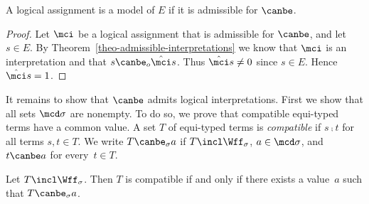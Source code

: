 \begin{lem}
  \label{lemma-adm-model}
  A logical assignment is a model of $E$ if it is
  admissible for $\canbe$.
\end{lem}

\begin{proof}
  Let $\mci$ be a logical assignment that is
  admissible for $\canbe$, and let $s\in E$.  By
  Theorem~\ref{theo-admissible-interpretations} we know
  that $\mci$ is an interpretation and that
  $s\canbe_o\hat\mci s$.  Thus $\hat\mci s\neq0$ since
  $s\in E$.  Hence $\hat\mci s=1$.
\end{proof}

It remains to show that $\canbe$ admits logical
interpretations.  First we show that all sets
$\mcd\sigma$ are nonempty.  To do so, we prove that
compatible equi-typed terms have a common value.  A set
$T$ of equi-typed terms is \emph{compatible} if $s\comp
t$ for all terms $s,t\in T$.  We write
\emph{$T\canbe_\sigma a$} if $T\incl\Wff_\sigma$,
$a\in\mcd\sigma$, and $t\canbe a$ for every~$t\in T$.

\begin{lem}
  \label{lem-common-value}
  Let $T\incl\Wff_\sigma$.  Then $T$ is compatible if
  and only if there exists a value~$a$ such that
  $T\canbe_\sigma a$.
\end{lem}

